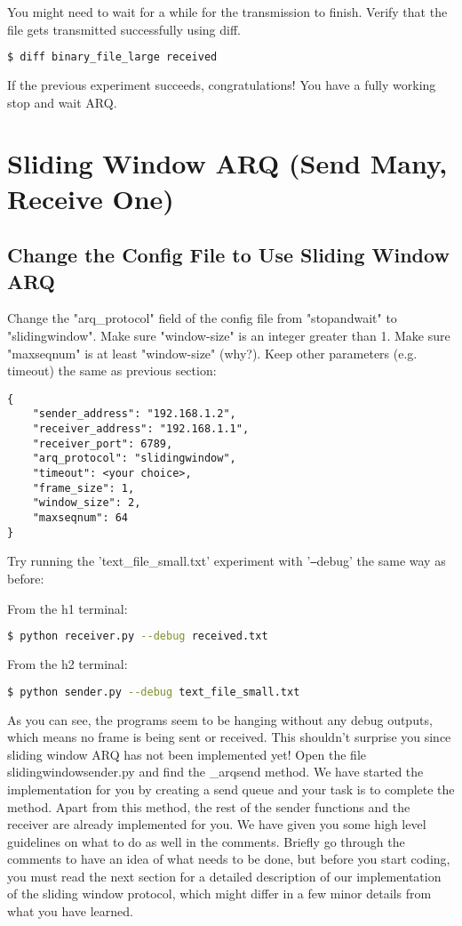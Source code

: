 \documentclass[11pt]{article}
\begin{document}
\noindent You might need to wait for a while for the transmission to finish. Verify that the file gets transmitted successfully using diff.
\begin{lstlisting}[language=bash]
$ diff binary_file_large received
\end{lstlisting}

\noindent If the previous experiment succeeds, congratulations! You have a fully working stop and wait ARQ.

\section{Sliding Window ARQ (Send Many, Receive One)}

\subsection{Change the Config File to Use Sliding Window ARQ}
Change the "arq\_protocol" field of the config file from "stopandwait" to "slidingwindow". Make sure "window-size" is an integer greater than 1. Make sure "maxseqnum" is at least "window-size" (why?). Keep other parameters (e.g. timeout) the same as previous section:

\begin{lstlisting}[caption={Sliding Window Configuration}]
{
    "sender_address": "192.168.1.2",
    "receiver_address": "192.168.1.1",
    "receiver_port": 6789,
    "arq_protocol": "slidingwindow",
    "timeout": <your choice>,
    "frame_size": 1,
    "window_size": 2,
    "maxseqnum": 64
}
\end{lstlisting}


Try running the 'text\_file\_small.txt' experiment with '\texttt{--}debug' the same way as before:

\noindent From the h1 terminal:
\begin{lstlisting}[language=bash]
$ python receiver.py --debug received.txt
\end{lstlisting}
From the h2 terminal:
\begin{lstlisting}[language=bash]
$ python sender.py --debug text_file_small.txt
\end{lstlisting}

As you can see, the programs seem to be hanging without any debug outputs, which means no frame is being sent or received. This shouldn't surprise you since sliding window ARQ has not been implemented yet! Open the file slidingwindowsender.py and find the \_arqsend method. We have started the implementation for you by creating a send queue and your task is to complete the method. Apart from this method, the rest of the sender functions and the receiver are already implemented for you. We have given you some high level guidelines on what to do as well in the comments. Briefly go through the comments to have an idea of what needs to be done, but before you start coding, you must read the next section for a detailed description of our implementation of the sliding window protocol, which might differ in a few minor details from what you have learned.
\end{document}
